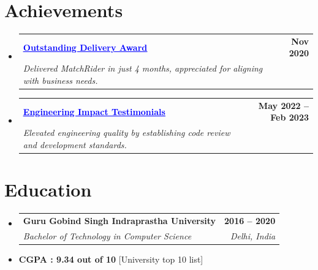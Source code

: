 \documentclass[letterpaper,10pt]{article}
\makeatletter
\newcommand{\resumeItem}[1]{
  \item\small{
    {#1 \vspace{-2pt}}
  }
}
\newcommand{\resumeSubheading}[4]{
  \vspace{-2pt}\item
    \begin{tabular*}{1.0\textwidth}[t]{l@{\extracolsep{\fill}}r}
      \textbf{#1} & \textbf{\small #2} \\
      \textit{\small#3} & \textit{\small #4} \\
    \end{tabular*}\vspace{-7pt}
}
\newcommand{\resumeSubHeadingListStart}{\begin{itemize}[leftmargin=0.0in, label={}]}
\newcommand{\resumeSubHeadingListEnd}{\end{itemize}}
\makeatother
\begin{document}
\section{Achievements}
\resumeSubHeadingListStart
\resumeSubheading{\href{https://drive.google.com/drive/u/1/folders/1dMF82uPbvHjp7ZFfwgRY36duLTu1IO10}{\textcolor{blue}{\underline{Outstanding Delivery Award}}}}{Nov 2020}{Delivered MatchRider in just 4 months, appreciated for aligning with business needs.}{}
\resumeSubheading{\href{https://drive.google.com/drive/folders/1kl8TmB8SaVZ5YwXo8xHsloigwAdjzRR5}{\textcolor{blue}{\underline{Engineering Impact Testimonials}}}}{May 2022 -- Feb 2023}{Elevated engineering quality by establishing code review and development standards.}{}
\resumeSubHeadingListEnd

\section{Education}
\resumeSubHeadingListStart
\resumeSubheading{Guru Gobind Singh Indraprastha University}{2016 -- 2020}{Bachelor of Technology in Computer Science}{Delhi, India}
\resumeItem{\textbf{CGPA : 9.34 out of 10} [University top 10 list]}

\resumeSubHeadingListEnd
\end{document}

